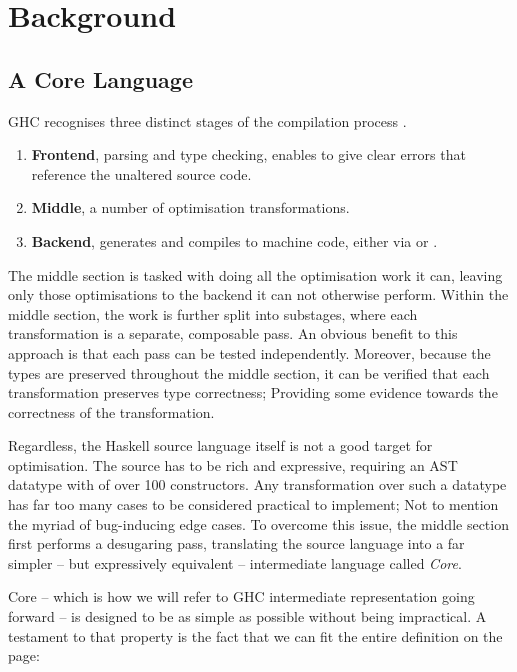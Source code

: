 \chapter{Background}

\section{A Core Language}
\label{section:background:core_lang}

GHC recognises three distinct stages of the compilation process \cite{haskell_optimisations_1997}.

\begin{enumerate}
  \item \textbf{Frontend}, parsing and type checking, enables to give clear errors that reference the unaltered source code.
  \item \textbf{Middle}, a number of optimisation transformations.
  \item \textbf{Backend}, generates and compiles to machine code, either via  or .
\end{enumerate}

The middle section is tasked with doing all the optimisation work it can, leaving only those optimisations to the backend
it can not otherwise perform. Within the middle section, the work is further split into substages, where each transformation
is a separate, composable pass. An obvious benefit to this approach is that each pass can be tested independently. Moreover, because
the types are preserved throughout the middle section, it can be verified that each transformation preserves type correctness;
Providing some evidence towards the correctness of the transformation.

Regardless, the Haskell source language itself is not a good target for optimisation. The source has to be
rich and expressive, requiring an AST datatype with of over 100 constructors. Any transformation over such a datatype has far too
many cases to be considered practical to implement; Not to mention the myriad of bug-inducing edge cases. To overcome this issue, the
middle section first performs a desugaring pass, translating the source language into a far simpler -- but expressively equivalent -- 
intermediate language called \textit{Core}. 

Core -- which is how we will refer to GHC intermediate representation going forward -- is designed to be as simple as possible
without being impractical. A testament to that property is the fact that we can fit the entire definition on the page:

